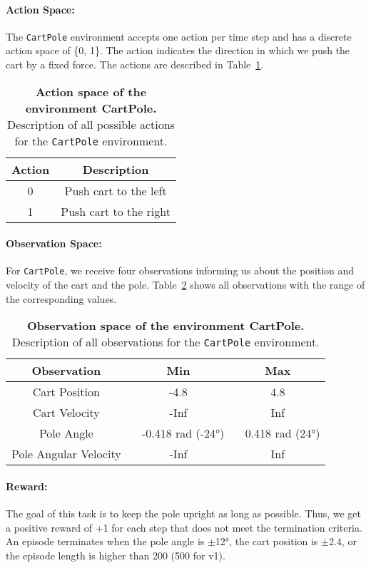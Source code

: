 \paragraph*{Action Space:} The \verb|CartPole| environment accepts one action per time step and has a discrete action space of \{0, 1\}. The action indicates the direction in which we push the cart by a fixed force. The actions are described in Table~\ref{table:cartpole_act}.
\begin{table}[!ht]
  \centering
  \begin{tabular}{ |c|c| }
    \hline
    Action & Description \\
    \hline
    0 & Push cart to the left \\
    1 & Push cart to the right \\
    \hline
  \end{tabular}
  \caption[Action space of the environment CartPole]{
    \textbf{Action space of the environment CartPole.}
    Description of all possible actions for the \texttt{CartPole} environment.
  }
  \label{table:cartpole_act}
\end{table}

\paragraph*{Observation Space:} For \verb|CartPole|, we receive four observations informing us about the position and velocity of the cart and the pole. Table~\ref{table:cartpole_obs} shows all observations with the range of the corresponding values.
\begin{table}[!ht]
  \centering
  \begin{tabular}{ |c|c|c| }
    \hline
    Observation & Min & Max \\
    \hline
    Cart Position & -4.8 & 4.8 \\
    Cart Velocity & -Inf & Inf \\
    Pole Angle & ~ -0.418 rad (-24°) & ~ 0.418 rad (24°) \\
    Pole Angular Velocity & -Inf & Inf \\
    \hline
  \end{tabular}
  \caption[Observation space of the environment CartPole]{
    \textbf{Observation space of the environment CartPole.}
    Description of all observations for the \texttt{CartPole} environment.
  }
  \label{table:cartpole_obs}
\end{table}

\paragraph*{Reward:} The goal of this task is to keep the pole upright as long as possible. Thus, we get a positive reward of +1 for each step that does not meet the termination criteria. An episode terminates when the pole angle is $\pm$12°, the cart position is $\pm$2.4, or the episode length is higher than 200 (500 for v1).

